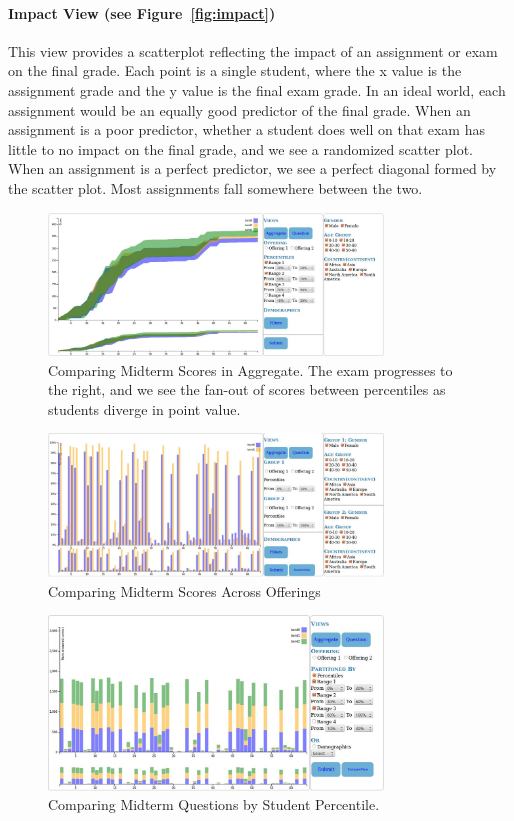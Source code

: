 \paragraph{Impact View (see Figure~\ref{fig:impact})}
This view provides a scatterplot reflecting the impact of an assignment or exam on the final grade. Each point is a single student, where the x value is the assignment grade and the y value is the final exam grade. In an ideal world, each assignment would be an equally good predictor of the final grade. When an assignment is a poor predictor, whether a student does well on that exam has little to no impact on the final grade, and we see a randomized scatter plot. When an assignment is a perfect predictor, we see a perfect diagonal formed by the scatter plot. Most assignments fall somewhere between the two.


\begin{figure}[htb]
 \centering
 \includegraphics[width=3.5in]{Midterm_Final_Aggregate.jpeg}
 \caption{Comparing Midterm Scores in Aggregate. The exam progresses to the right, and we see the fan-out of scores between percentiles as students diverge in point value. }
\label{fig:exam1}	
\end{figure}

\begin{figure}[htb]
 \centering
 \includegraphics[width=3.5in]{Midterm_Final_Compare.jpeg}
 \caption{Comparing Midterm Scores Across Offerings }
\label{fig:exam2}	
\end{figure}

\begin{figure}[htb]
 \centering
 \includegraphics[width=3.5in]{Midterm_Final_Questions.jpeg}
 \caption{Comparing Midterm Questions by Student Percentile. }
\label{fig:exam3}	
\end{figure}

